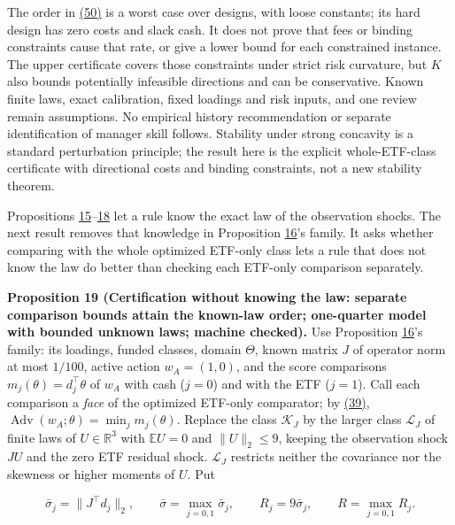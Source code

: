 \documentclass[11pt]{article}
\begin{document}
The order in \hyperref[eq:50]{(50)} is a worst case over designs, with loose
constants; its hard design has zero costs and slack cash. It
does not prove that fees or binding constraints cause that
rate, or give a lower bound for each constrained instance.
The upper certificate covers those constraints under strict
risk curvature, but \(K\) also bounds potentially infeasible
directions and can be conservative. Known finite laws, exact
calibration, fixed loadings and risk inputs, and one review
remain assumptions. No empirical history recommendation or
separate identification of manager skill follows. Stability under
strong concavity is a standard perturbation principle; the result
here is the explicit whole-ETF-class certificate with directional
costs and binding constraints, not a new stability theorem.

Propositions \hyperref[res:Proposition-15]{15}--\hyperref[res:Proposition-18]{18} let a rule know the exact law of the
observation shocks. The next result removes that knowledge in
Proposition \hyperref[res:Proposition-16]{16}'s family. It asks whether comparing with the whole
optimized ETF-only class lets a rule that does not know the law do
better than checking each ETF-only comparison separately.

\label{res:Proposition-19}
\textbf{Proposition 19 (Certification without knowing the law: separate comparison bounds attain the known-law order; one-quarter model with bounded unknown laws; machine checked).}
Use Proposition \hyperref[res:Proposition-16]{16}'s family: its loadings, funded classes, domain
\(\Theta\), known matrix \(J\) of operator norm at most
\(1/100\), active action \(w_A=(1,0)\), and the score
comparisons \(m_j(\theta)=d_j^\top\theta\) of \(w_A\) with
cash (\(j=0\)) and with the ETF (\(j=1\)). Call each
comparison a \emph{face} of the optimized ETF-only comparator; by
\hyperref[eq:39]{(39)}, \(\operatorname{Adv}(w_A;\theta)=\min_jm_j(\theta)\).
Replace the class \(\mathcal K_J\) by the larger class
\(\mathcal L_J\) of finite laws of \(U\in\mathbb R^3\) with
\(\mathbb EU=0\) and \(\|U\|_2\leq9\), keeping the
observation shock \(JU\) and the zero ETF residual shock.
\(\mathcal L_J\) restricts neither the covariance nor the
skewness or higher moments of \(U\). Put

\begin{equation*}
\bar\sigma_j=\|J^\top d_j\|_2,\qquad
\bar\sigma=\max_{j=0,1}\bar\sigma_j,\qquad
R_j=9\bar\sigma_j,\qquad R=\max_{j=0,1}R_j.\tag{52}\label{eq:52}
\end{equation*}
\end{document}
